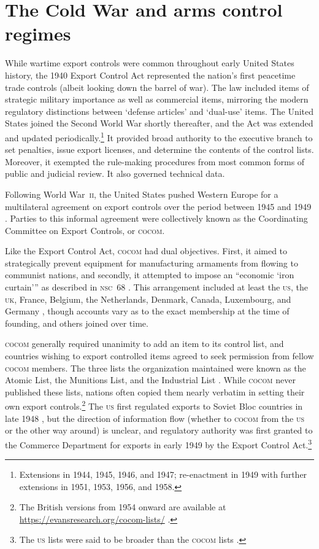 \documentclass[preprint,twocolumn,5p]{elsarticle}
\begin{document}
\section{The Cold War and arms control regimes}\label{sec:coldwar}
While wartime export controls were common throughout early United States history, the 1940 Export Control Act represented the nation's first peacetime trade controls (albeit looking down the barrel of war). The law included items of strategic military importance as well as commercial items, mirroring the modern regulatory distinctions between `defense articles' and `dual-use' items. The United States joined the Second World War shortly thereafter, and the Act was extended and updated periodically.\footnote{Extensions in 1944, 1945, 1946, and 1947; re-enactment in 1949 with further extensions in 1951, 1953, 1956, and 1958.} It provided broad authority to the executive branch to set penalties, issue export licenses, and determine the contents of the control lists. Moreover, it exempted the rule-making procedures from most common forms of public and judicial review. It also governed technical data. \citep{NAP1987}

Following World War~\textsc{ii}, the United States pushed Western Europe for a multilateral agreement on export controls over the period between 1945 and 1949 \citep{Yasuhara1991}. Parties to this informal agreement were collectively known as the Coordinating Committee on Export Controls, or \textsc{cocom}.

Like the Export Control Act, \textsc{cocom} had dual objectives. First, it aimed to strategically prevent equipment for manufacturing armaments from flowing to communist nations, and secondly, it attempted to impose an ``economic `iron curtain''' as described in \textsc{nsc}~68 \citep{NSC68}. This arrangement included at least the \textsc{us}, the \textsc{uk}, France, Belgium, the Netherlands, Denmark, Canada, Luxembourg, and Germany \citep{Yasuhara1991}, though accounts vary as to the exact membership at the time of founding, and others joined over time.

\textsc{cocom} generally required unanimity to add an item to its control list, and countries wishing to export controlled items agreed to seek permission from fellow \textsc{cocom} members. The three lists the organization maintained were known as the Atomic List, the Munitions List, and the Industrial List \citep{Evans2014}. While \textsc{cocom} never published these lists, nations often copied them nearly verbatim in setting their own export controls.\footnote{The British versions from 1954 onward are available at \url{https://evansresearch.org/cocom-lists/} \citep{Evans2015}.} The \textsc{us} first regulated exports to Soviet Bloc countries in late 1948 \citep{Aoi2016}, but the direction of information flow (whether to \textsc{cocom} from the \textsc{us} or the other way around) is unclear, and regulatory authority was first granted to the Commerce Department for exports in early 1949 by the Export Control Act.\footnote{The \textsc{us} lists were said to be broader than the \textsc{cocom} lists \citep{NAP1987}.} %
\end{document}
